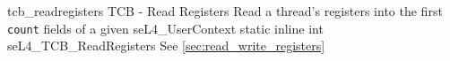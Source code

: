 %
%
%
%

\apidoc
{tcb_readregisters}
{TCB - Read Registers}
{Read a thread's registers into the first \texttt{count} fields of a given
seL4\_UserContext}
{static inline int seL4\_TCB\_ReadRegisters}
{
}
{\errorenumdesc}
{See \autoref{sec:read_write_registers}}
